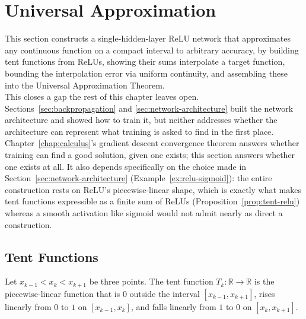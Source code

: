 \section{Universal Approximation}
\label{sec:universal-approximation}
	
	This section constructs a single-hidden-layer ReLU network that approximates any continuous function on a compact interval to arbitrary accuracy, by building tent functions from ReLUs, showing their sums interpolate a target function, bounding the interpolation error via uniform continuity, and assembling these into the Universal Approximation Theorem. \\
	
	This closes a gap the rest of this chapter leaves open. Sections~\ref{sec:backpropagation} and \ref{sec:network-architecture} built the network architecture and showed how to train it, but neither addresses whether the architecture can represent what training is asked to find in the first place. \\
	
	Chapter~\ref{chap:calculus}'s gradient descent convergence theorem answers whether training can find a good solution, given one exists; this section answers whether one exists at all. It also depends specifically on the choice made in Section~\ref{sec:network-architecture} (Example~\ref{ex:relu-sigmoid}): the entire construction rests on ReLU's piecewise-linear shape, which is exactly what makes tent functions expressible as a finite sum of ReLUs (Proposition~\ref{prop:tent-relu}) whereas a smooth activation like sigmoid would not admit nearly as direct a construction.

	\subsection{Tent Functions}
		
		\begin{definition}
			\label{def:tent-function}
			Let $x_{k-1}<x_k<x_{k+1}$ be three points. The tent function $T_k:\mathbb{R}\to\mathbb{R}$ is the piecewise-linear function that is $0$ outside the interval $[x_{k-1},x_{k+1}]$, rises linearly from $0$ to $1$ on $[x_{k-1},x_k]$, and falls linearly from $1$ to $0$ on $[x_k,x_{k+1}]$.
		\end{definition}
		
